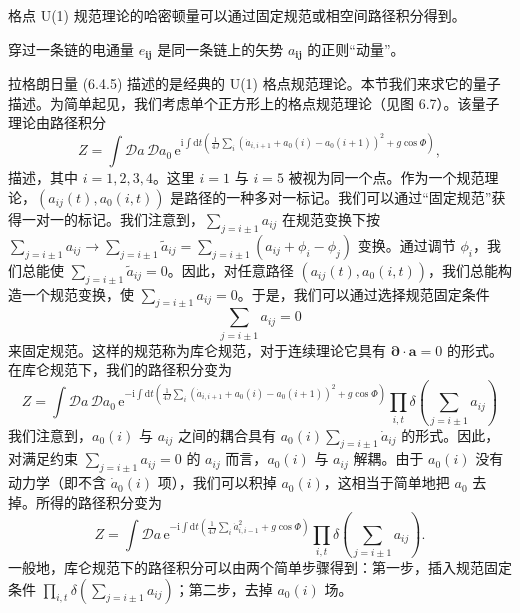 \begin{keypoints}
\item 格点 U(1) 规范理论的哈密顿量可以通过固定规范或相空间路径积分得到。
\item 穿过一条链的电通量 $e_{\pmb{i}\pmb{j}}$ 是同一条链上的矢势 $a_{\pmb{i}\pmb{j}}$ 的正则“动量”。
\end{keypoints}

拉格朗日量 (6.4.5) 描述的是经典的 U(1) 格点规范理论。本节我们来求它的量子描述。为简单起见，我们考虑单个正方形上的格点规范理论（见图 6.7）。该量子理论由路径积分
\begin{equation*}
Z=\int\mathcal{D}a\,\mathcal{D}a_{0}\,\mathrm{e}^{\mathrm{i}\int\mathrm{d}t\left(\frac{1}{4J}\sum_{i}(\dot{a}_{i,i+1}+a_{0}(i)-a_{0}(i+1))^{2}+g\cos\Phi\right)}, \tag{6.4.10}
\end{equation*}
描述，其中 $i=1,2,3,4$。这里 $i=1$ 与 $i=5$ 被视为同一个点。作为一个规范理论，$(a_{ij}(t),a_{0}(i,t))$ 是路径的一种多对一标记。我们可以通过“固定规范”获得一对一的标记。我们注意到，$\sum_{j=i\pm1}a_{ij}$ 在规范变换下按
$\sum_{j=i\pm1}a_{ij}\rightarrow\sum_{j=i\pm1}\tilde{a}_{ij}=\sum_{j=i\pm1}(a_{ij}+\phi_{i}-\phi_{j})$
变换。通过调节 $\phi_{i}$，我们总能使 $\sum_{j=i\pm1}\tilde{a}_{ij}=0$。因此，对任意路径 $(a_{ij}(t),a_{0}(i,t))$，我们总能构造一个规范变换，使 $\sum_{j=i\pm1}a_{ij}=0$。于是，我们可以通过选择规范固定条件
\begin{equation*}
\sum_{j=i\pm1}a_{ij}=0
\end{equation*}
来固定规范。这样的规范称为库仑规范，对于连续理论它具有 $\pmb{\partial}\cdot\pmb{a}=0$ 的形式。在库仑规范下，我们的路径积分变为
\begin{equation*}
Z=\int\mathcal{D}a\,\mathcal{D}a_{0}\,\mathrm{e}^{-\mathrm{i}\int\mathrm{d}t\left(\frac{1}{4J}\sum_{i}(\dot{a}_{i,i+1}+a_{0}(i)-a_{0}(i+1))^{2}+g\cos\Phi\right)}\prod_{i,t}\delta\left(\sum_{j=i\pm1}a_{ij}\right)
\end{equation*}
我们注意到，$a_{0}(i)$ 与 $a_{ij}$ 之间的耦合具有 $a_{0}(i)\sum_{j=i\pm1}\dot{a}_{ij}$ 的形式。因此，对满足约束 $\sum_{j=i\pm1}a_{ij}=0$ 的 $a_{ij}$ 而言，$a_{0}(i)$ 与 $a_{ij}$ 解耦。由于 $a_{0}(i)$ 没有动力学（即不含 $\dot{a}_{0}(i)$ 项），我们可以积掉 $a_{0}(i)$，这相当于简单地把 $a_{0}$ 去掉。所得的路径积分变为
\begin{equation*}
Z=\int\mathcal{D}a\,\mathrm{e}^{-\mathrm{i}\int\mathrm{d}t\left(\frac{1}{4J}\sum_{i}\dot{a}_{i,i-1}^{2}+g\cos\Phi\right)}\prod_{i,t}\delta\left(\sum_{j=i\pm1}a_{ij}\right).
\end{equation*}
一般地，库仑规范下的路径积分可以由两个简单步骤得到：第一步，插入规范固定条件 $\prod_{i,t}\allowbreak\delta(\sum_{j=i\pm1}\allowbreak a_{ij})$；第二步，去掉 $a_{0}(i)$ 场。

